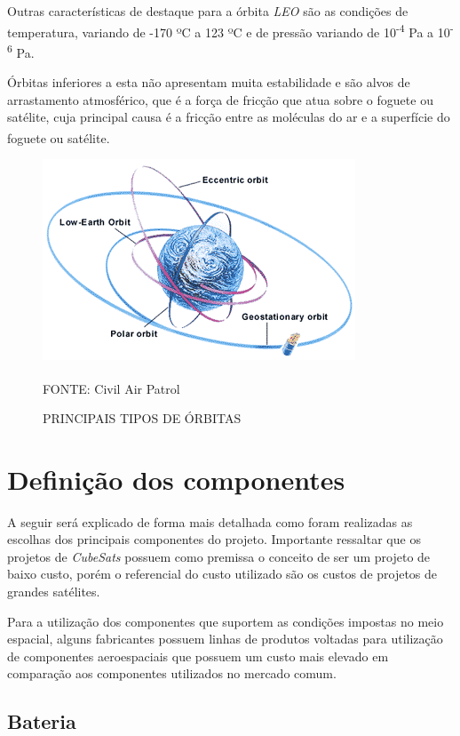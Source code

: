 \documentclass[
	12pt,				%
	openright,			%
	oneside,			%
	a4paper,			%
	english,			%
	french,				%
	spanish,			%
	brazil,				%
	oldfontcommands
	]{abntex2}
\begin{document}
	 Outras características de destaque para a órbita \textit{LEO} são as condições de temperatura, variando de -170 ºC a 123 ºC e de pressão variando de 10\textsuperscript{-4} Pa a 10\textsuperscript{-6} Pa.\textsuperscript{\cite{LEO}}
	
	Órbitas inferiores a esta não apresentam muita estabilidade e são alvos de arrastamento atmosférico, que é a força de fricção que atua sobre o foguete ou satélite, cuja principal causa é a fricção entre as moléculas do ar e a superfície do foguete ou satélite.\textsuperscript{\cite{NASA2}}
	
	\begin{figure}[th]
		\caption{PRINCIPAIS TIPOS DE ÓRBITAS}
		\centering
		\includegraphics[width=0.5\linewidth]{./figs/cubesat_03}
			
		\begin{small}
			FONTE: Civil Air Patrol\textsuperscript{\cite{CAP}}
		\end{small}		
	\end{figure}	
	
	\pagebreak
	
	
\section[Definição dos componentes]{Definição dos componentes}

	A seguir será explicado de forma mais detalhada como foram realizadas as escolhas dos principais componentes do projeto. Importante ressaltar que os projetos de \textit{CubeSats} possuem como premissa o conceito de ser um projeto de baixo custo, porém o referencial do custo utilizado são os custos de projetos de grandes satélites.
	
	Para a utilização dos componentes que suportem as condições impostas  no meio espacial, alguns fabricantes possuem linhas de produtos voltadas para utilização de componentes aeroespaciais que possuem um custo mais elevado em comparação aos componentes utilizados no mercado comum.

\subsection[Bateria]{Bateria}
\end{document}
